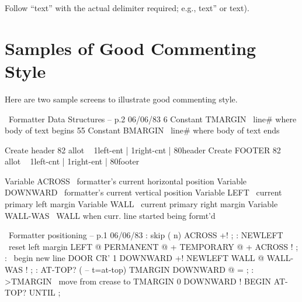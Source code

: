\noindent Follow ``text'' with the actual delimiter required; e.g., text''
or text).

\section{Samples of Good Commenting Style}

Here are two sample screens to illustrate good commenting
style.

\setcounter{screen}{126}
\begin{Screen}
\ Formatter         Data Structures -- p.2             06/06/83
 6 Constant TMARGIN \ line# where body of text begins
55 Constant BMARGIN \ line# where body of text ends

Create header 82 allot
\  { 1left-ent | 1right-cnt | 80header }
Create FOOTER 82 allot
\  { 1left-cnt | 1right-ent | 80footer }

Variable ACROSS   \ formatter's current horizontal position
Variable DOWNWARD \ formatter's current vertical position
Variable LEFT     \ current primary left margin
Variable WALL     \ current primary right margin
Variable WALL-WAS \ WALL when curr. line started being formt'd

\end{Screen}

\begin{Screen}
\ Formatter          positioning -- p.1               06/06/83
: skip  ( n)  ACROSS +! ;
: NEWLEFT  \ reset left margin
   LEFT @  PERMANENT @ +  TEMPORARY @ +  ACROSS ! ;
: \LINE  \ begin new line
   DOOR  CR'  1 DOWNWARD +!  NEWLEFT  WALL @  WALL-WAS ! ;
: AT-TOP?  ( -- t=at-top)  TMARGIN  DOWNWARD @ = ;
: >TMARGIN  \ move from crease to TMARGIN
   0 DOWNWARD !  BEGIN  \LINE  AT-TOP? UNTIL ;

\end{Screen}

